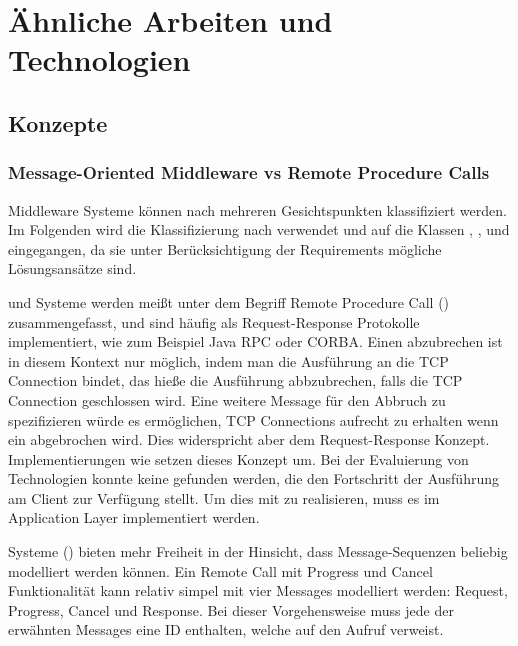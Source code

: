 
\chapter{Ähnliche Arbeiten und Technologien}
\label{K2}
\section{Konzepte}


\subsection{Message-Oriented Middleware vs Remote Procedure Calls}
Middleware Systeme können nach mehreren Gesichtspunkten klassifiziert werden.
Im Folgenden wird die Klassifizierung nach \cite{bishop2003survey} verwendet und auf die Klassen , , und  eingegangen, da sie unter Berücksichtigung der Requirements mögliche Lösungsansätze sind.

 und  Systeme werden meißt unter dem Begriff Remote Procedure Call (\rpc{}) zusammengefasst,
und sind häufig als Request-Response Protokolle implementiert, wie zum Beispiel Java RPC oder CORBA.
Einen \rpc{} abzubrechen ist in diesem Kontext nur möglich, indem man die Ausführung an die TCP Connection bindet, das hieße die Ausführung abbzubrechen, falls die TCP Connection geschlossen wird.
Eine weitere Message für den Abbruch zu spezifizieren würde es ermöglichen, TCP Connections aufrecht zu erhalten wenn ein \rpc{} abgebrochen wird.
Dies widerspricht aber dem Request-Response Konzept.
\rpc{} Implementierungen wie \cite{qooxdoo} setzen dieses Konzept um.
Bei der Evaluierung von \rpc{} Technologien konnte keine gefunden werden, die den Fortschritt der Ausführung am Client zur Verfügung stellt.
Um dies mit \rpc{} zu realisieren, muss es im Application Layer implementiert werden.

 Systeme (\mom{}) bieten mehr Freiheit in der Hinsicht, dass Message-Sequenzen beliebig modelliert werden können.
Ein Remote Call mit Progress und Cancel Funktionalität kann relativ simpel mit vier Messages modelliert werden:
Request, Progress, Cancel und Response.
Bei dieser Vorgehensweise muss jede der erwähnten Messages eine ID enthalten, welche auf den Aufruf verweist.

